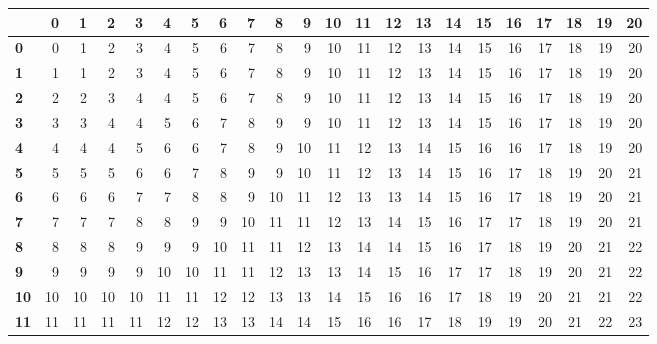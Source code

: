 \documentclass[10pt]{article}
\begin{document}
\pagestyle{empty}

\setlength\extrarowheight{5pt}

\begin{table}[ht]
  \centering
  \begin{tabu}{|>{\bfseries}l|rrr|rrr|rrr|rrr|rrr|rrr|rrr|}\hline

    \rowfont{\bfseries}
       & 0  & 1  & 2  & 3  & 4  & 5  & 6  & 7  & 8  & 9  & 10 & 11 & 12 & 13 & 14 & 15 & 16 & 17 & 18 & 19 & 20\\\hline

    0  & 0  & 1  & 2  & 3  & 4  & 5  & 6  & 7  & 8  & 9  & 10 & 11 & 12 & 13 & 14 & 15 & 16 & 17 & 18 & 19 & 20\\
    1  & 1  & 1  & 2  & 3  & 4  & 5  & 6  & 7  & 8  & 9  & 10 & 11 & 12 & 13 & 14 & 15 & 16 & 17 & 18 & 19 & 20\\
    2  & 2  & 2  & 3  & 4  & 4  & 5  & 6  & 7  & 8  & 9  & 10 & 11 & 12 & 13 & 14 & 15 & 16 & 17 & 18 & 19 & 20\\

    3  & 3  & 3  & 4  & 4  & 5  & 6  & 7  & 8  & 9  & 9  & 10 & 11 & 12 & 13 & 14 & 15 & 16 & 17 & 18 & 19 & 20\\
    4  & 4  & 4  & 4  & 5  & 6  & 6  & 7  & 8  & 9  & 10 & 11 & 12 & 13 & 14 & 15 & 16 & 16 & 17 & 18 & 19 & 20\\
    5  & 5  & 5  & 5  & 6  & 6  & 7  & 8  & 9  & 9  & 10 & 11 & 12 & 13 & 14 & 15 & 16 & 17 & 18 & 19 & 20 & 21\\

    6  & 6  & 6  & 6  & 7  & 7  & 8  & 8  & 9  & 10 & 11 & 12 & 13 & 13 & 14 & 15 & 16 & 17 & 18 & 19 & 20 & 21\\
    7  & 7  & 7  & 7  & 8  & 8  & 9  & 9  & 10 & 11 & 11 & 12 & 13 & 14 & 15 & 16 & 17 & 17 & 18 & 19 & 20 & 21\\
    8  & 8  & 8  & 8  & 9  & 9  & 9  & 10 & 11 & 11 & 12 & 13 & 14 & 14 & 15 & 16 & 17 & 18 & 19 & 20 & 21 & 22\\

    9  & 9  & 9  & 9  & 9  & 10 & 10 & 11 & 11 & 12 & 13 & 13 & 14 & 15 & 16 & 17 & 17 & 18 & 19 & 20 & 21 & 22\\
    10 & 10 & 10 & 10 & 10 & 11 & 11 & 12 & 12 & 13 & 13 & 14 & 15 & 16 & 16 & 17 & 18 & 19 & 20 & 21 & 21 & 22\\
    11 & 11 & 11 & 11 & 11 & 12 & 12 & 13 & 13 & 14 & 14 & 15 & 16 & 16 & 17 & 18 & 19 & 19 & 20 & 21 & 22 & 23\\


\end{tabu}
\end{table}
\end{document}
